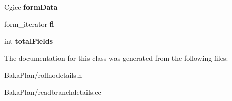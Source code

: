 \begin{DoxyCompactItemize}
\item 
\hypertarget{classReadBranchDetails_a7bb99a6ec821f098371df4cb65ab8f65}{Cgicc {\bfseries form\-Data}}\label{classReadBranchDetails_a7bb99a6ec821f098371df4cb65ab8f65}

\item 
\hypertarget{classReadBranchDetails_a6ffffa42ad379f516a3419496469a0d6}{form\-\_\-iterator {\bfseries fi}}\label{classReadBranchDetails_a6ffffa42ad379f516a3419496469a0d6}

\item 
\hypertarget{classReadBranchDetails_afc1d050b96d76aa1e3a8f31a39f7658b}{int {\bfseries total\-Fields}}\label{classReadBranchDetails_afc1d050b96d76aa1e3a8f31a39f7658b}

\end{DoxyCompactItemize}


The documentation for this class was generated from the following files\-:\begin{DoxyCompactItemize}
\item 
Baka\-Plan/rollnodetails.\-h\item 
Baka\-Plan/readbranchdetails.\-cc\end{DoxyCompactItemize}
